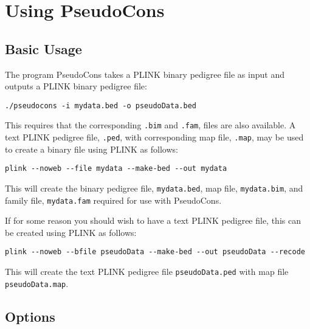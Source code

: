\documentclass[a4paper,12pt]{article}
\newcommand{\code}[1]{{\footnotesize{{\tt #1}}}}
\begin{document}
\section{Using PseudoCons}
\label{using}
\subsection{Basic Usage}
\label{basic-usage}

The program PseudoCons takes a PLINK binary pedigree file as input and outputs a PLINK binary pedigree file: 
\begin{verbatim}
./pseudocons -i mydata.bed -o pseudoData.bed
\end{verbatim}

This requires that the corresponding \code{.bim} and \code{.fam}, files are also available. A text PLINK pedigree file, \code{.ped}, with corresponding map file, \code{.map}, may be used to create a binary file using PLINK as follows: \begin{verbatim}
plink --noweb --file mydata --make-bed --out mydata
\end{verbatim}


This will create the binary pedigree file, \code{mydata.bed}, map file, \code{mydata.bim}, and family file, \code{mydata.fam} required for use with PseudoCons. 

If for some reason you should wish to have a text PLINK pedigree file, this can be created using PLINK as follows: 
\begin{verbatim}
plink --noweb --bfile pseudoData --make-bed --out pseudoData --recode
\end{verbatim}

This will create the text PLINK pedigree file \code{pseudoData.ped} with map file \code{pseudoData.map}. 


\subsection{Options}
\label{options}
\end{document}
